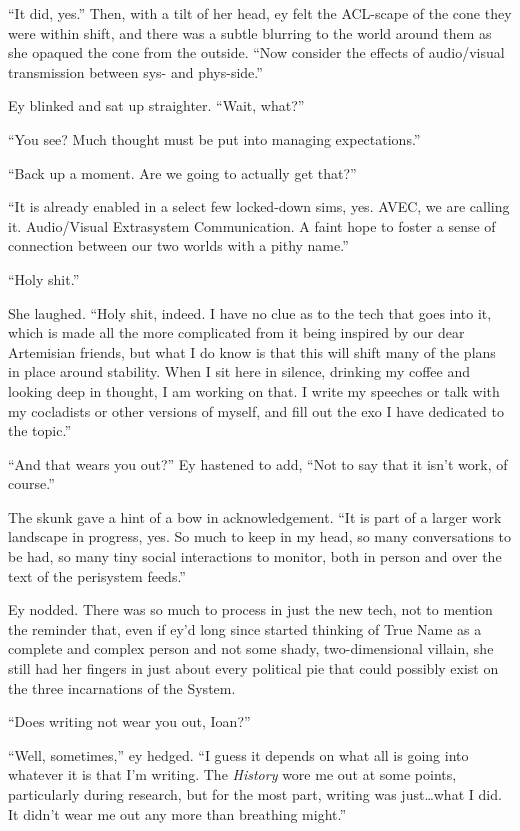 ``It did, yes.'' Then, with a tilt of her head, ey felt the ACL-scape of the cone they were within shift, and there was a subtle blurring to the world around them as she opaqued the cone from the outside. ``Now consider the effects of audio/visual transmission between sys- and phys-side.''

Ey blinked and sat up straighter. ``Wait, what?''

``You see? Much thought must be put into managing expectations.''

``Back up a moment. Are we going to actually get that?''

``It is already enabled in a select few locked-down sims, yes. AVEC, we are calling it. Audio/Visual Extrasystem Communication. A faint hope to foster a sense of connection between our two worlds with a pithy name.''

``Holy shit.''

She laughed. ``Holy shit, indeed. I have no clue as to the tech that goes into it, which is made all the more complicated from it being inspired by our dear Artemisian friends, but what I do know is that this will shift many of the plans in place around stability. When I sit here in silence, drinking my coffee and looking deep in thought, I am working on that. I write my speeches or talk with my cocladists or other versions of myself, and fill out the exo I have dedicated to the topic.''

``And that wears you out?'' Ey hastened to add, ``Not to say that it isn't work, of course.''

The skunk gave a hint of a bow in acknowledgement. ``It is part of a larger work landscape in progress, yes. So much to keep in my head, so many conversations to be had, so many tiny social interactions to monitor, both in person and over the text of the perisystem feeds.''

Ey nodded. There was so much to process in just the new tech, not to mention the reminder that, even if ey'd long since started thinking of True Name as a complete and complex person and not some shady, two-dimensional villain, she still had her fingers in just about every political pie that could possibly exist on the three incarnations of the System.

``Does writing not wear you out, Ioan?''

``Well, sometimes,'' ey hedged. ``I guess it depends on what all is going into whatever it is that I'm writing. The \emph{History} wore me out at some points, particularly during research, but for the most part, writing was just\ldots what I did. It didn't wear me out any more than breathing might.''

